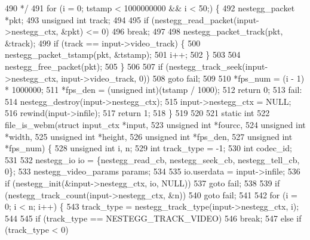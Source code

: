 \begin{DoxyCodeInclude}
{{{{{{{{{490 \textcolor{comment}{   */}
491   \textcolor{keywordflow}{for} (i = 0; tstamp < 1000000000 && i < 50;) \{
492     nestegg\_packet *pkt;
493     \textcolor{keywordtype}{unsigned} \textcolor{keywordtype}{int} track;
494 
495     \textcolor{keywordflow}{if} (nestegg\_read\_packet(input->nestegg\_ctx, &pkt) <= 0)
496       \textcolor{keywordflow}{break};
497 
498     nestegg\_packet\_track(pkt, &track);
499     \textcolor{keywordflow}{if} (track == input->video\_track) \{
500       nestegg\_packet\_tstamp(pkt, &tstamp);
501       i++;
502     \}
503 
504     nestegg\_free\_packet(pkt);
505   \}
506 
507   \textcolor{keywordflow}{if} (nestegg\_track\_seek(input->nestegg\_ctx, input->video\_track, 0))
508     \textcolor{keywordflow}{goto} fail;
509 
510   *fps\_num = (i - 1) * 1000000;
511   *fps\_den = (\textcolor{keywordtype}{unsigned} int)(tstamp / 1000);
512   \textcolor{keywordflow}{return} 0;
513 fail:
514   nestegg\_destroy(input->nestegg\_ctx);
515   input->nestegg\_ctx = NULL;
516   rewind(input->infile);
517   \textcolor{keywordflow}{return} 1;
518 \}
519 
520 
521 \textcolor{keyword}{static} \textcolor{keywordtype}{int}
522 file\_is\_webm(\textcolor{keyword}{struct} input\_ctx *input,
523              \textcolor{keywordtype}{unsigned} \textcolor{keywordtype}{int}     *fourcc,
524              \textcolor{keywordtype}{unsigned} \textcolor{keywordtype}{int}     *width,
525              \textcolor{keywordtype}{unsigned} \textcolor{keywordtype}{int}     *height,
526              \textcolor{keywordtype}{unsigned} \textcolor{keywordtype}{int}     *fps\_den,
527              \textcolor{keywordtype}{unsigned} \textcolor{keywordtype}{int}     *fps\_num) \{
528   \textcolor{keywordtype}{unsigned} \textcolor{keywordtype}{int} i, n;
529   \textcolor{keywordtype}{int}          track\_type = -1;
530   \textcolor{keywordtype}{int}          codec\_id;
531 
532   nestegg\_io io = \{nestegg\_read\_cb, nestegg\_seek\_cb, nestegg\_tell\_cb, 0\};
533   nestegg\_video\_params params;
534 
535   io.userdata = input->infile;
536   \textcolor{keywordflow}{if} (nestegg\_init(&input->nestegg\_ctx, io, NULL))
537     \textcolor{keywordflow}{goto} fail;
538 
539   \textcolor{keywordflow}{if} (nestegg\_track\_count(input->nestegg\_ctx, &n))
540     \textcolor{keywordflow}{goto} fail;
541 
542   \textcolor{keywordflow}{for} (i = 0; i < n; i++) \{
543     track\_type = nestegg\_track\_type(input->nestegg\_ctx, i);
544 
545     \textcolor{keywordflow}{if} (track\_type == NESTEGG\_TRACK\_VIDEO)
546       \textcolor{keywordflow}{break};
547     \textcolor{keywordflow}{else} \textcolor{keywordflow}{if} (track\_type < 0)
}}}}}}}}}
\end{DoxyCodeInclude}
